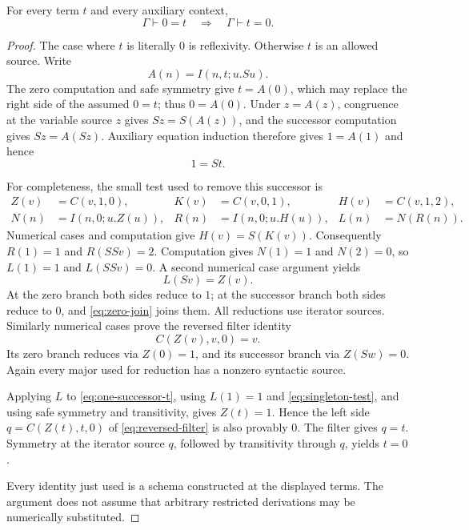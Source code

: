 \begin{lemma}\label{lem:zero-symmetry}
For every term $t$ and every auxiliary context,
\[
 \Gamma\vdash 0=t\quad\Longrightarrow\quad\Gamma\vdash t=0.
\]
\end{lemma}
\begin{proof}
The case where $t$ is literally $0$ is reflexivity.  Otherwise $t$ is an
allowed source.  Write
\[
 A(n)=I(n,t;u.Su).
\]
The zero computation and safe symmetry give $t=A(0)$, which may replace
the right side of the assumed $0=t$; thus $0=A(0)$.  Under
$z=A(z)$, congruence at the variable source $z$ gives
$Sz=S(A(z))$, and the successor computation gives $Sz=A(Sz)$.
Auxiliary equation induction therefore gives $1=A(1)$ and hence
\begin{equation}
 1=St.
 \label{eq:one-successor-t}
\end{equation}

For completeness, the small test used to remove this successor is
\[
 \begin{aligned}
 Z(v)&=C(v,1,0),& K(v)&=C(v,0,1),& H(v)&=C(v,1,2),\\
 N(n)&=I(n,0;u.Z(u)),& R(n)&=I(n,0;u.H(u)),& L(n)&=N(R(n)).
 \end{aligned}
\]
Numerical cases and computation give $H(v)=S(K(v))$.  Consequently
$R(1)=1$ and $R(SSv)=2$.  Computation gives $N(1)=1$ and $N(2)=0$,
so $L(1)=1$ and $L(SSv)=0$.  A second numerical case argument yields
\begin{equation}
 L(Sv)=Z(v).
 \label{eq:singleton-test}
\end{equation}
At the zero branch both sides reduce to $1$; at the successor branch
both sides reduce to $0$, and \eqref{eq:zero-join} joins them.  All
reductions use iterator sources.  Similarly numerical cases prove the
reversed filter identity
\begin{equation}
 C(Z(v),v,0)=v.
 \label{eq:reversed-filter}
\end{equation}
Its zero branch reduces via $Z(0)=1$, and its successor branch via
$Z(Sw)=0$.  Again every major used for reduction has a nonzero
syntactic source.

Applying $L$ to \eqref{eq:one-successor-t}, using
$L(1)=1$ and \eqref{eq:singleton-test}, and using safe symmetry and
transitivity, gives $Z(t)=1$.  Hence the left side
$q=C(Z(t),t,0)$ of \eqref{eq:reversed-filter} is also provably $0$.
The filter gives $q=t$.  Symmetry at the iterator source $q$, followed
by transitivity through $q$, yields $t=0$.

Every identity just used is a schema constructed at the displayed
terms.  The argument does not assume that arbitrary restricted
derivations may be numerically substituted.
\end{proof}

